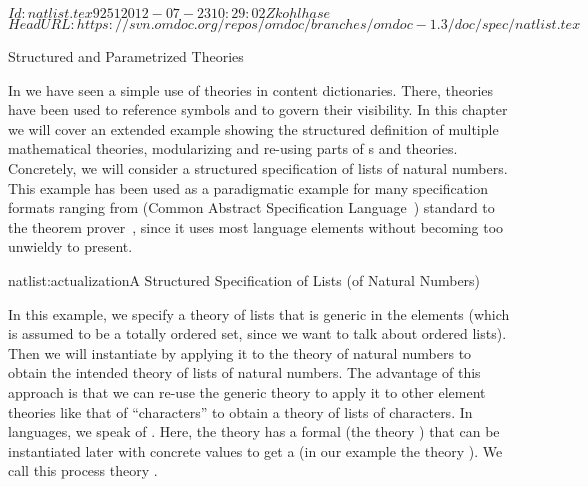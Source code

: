 \svnInfo $Id: natlist.tex 9251 2012-07-23 10:29:02Z kohlhase $
\svnKeyword $HeadURL: https://svn.omdoc.org/repos/omdoc/branches/omdoc-1.3/doc/spec/natlist.tex $

\begin{tchapter}[id=natlist]{Structured and Parametrized Theories}
  
In {} we have seen a simple use of theories in {\openmath} content
dictionaries. There, theories have been used to reference {\openmath} symbols and to
govern their visibility. In this chapter we will cover an extended example showing the
structured definition of multiple mathematical theories, modularizing and re-using parts
of {s} and theories.  Concretely, we will consider a
structured specification of lists of natural numbers. This example has been used as a
paradigmatic example for many specification formats ranging from {\casl} (Common Abstract
Specification Language~\cite{CoFI:2004:CASL-RM}) standard to the {\pvs} theorem prover~\cite{OwRu92},
since it uses most language elements without becoming too unwieldy to present.

\begin{myfig}{natlist:actualization}{A Structured Specification of Lists (of
    Natural Numbers)}
  \begin{tikzpicture}\end{tikzpicture}
\end{myfig}

In this example, we specify a theory {} of lists that is generic in the
elements (which is assumed to be a totally ordered set, since we want to talk about
ordered lists).  Then we will instantiate {} by applying it to the theory
{} of natural numbers to obtain the intended theory {} of
lists of natural numbers.  The advantage of this approach is that we can re-use the
generic theory {} to apply it to other element theories like that of
``characters'' to obtain a theory of lists of characters.  In
{} languages, we speak of {}.  Here, the theory {} has a formal
{} (the theory {}) that can be instantiated later with
concrete values to get a {} (in our example the theory
{}).  We call this process theory {}.


\end{tchapter}
